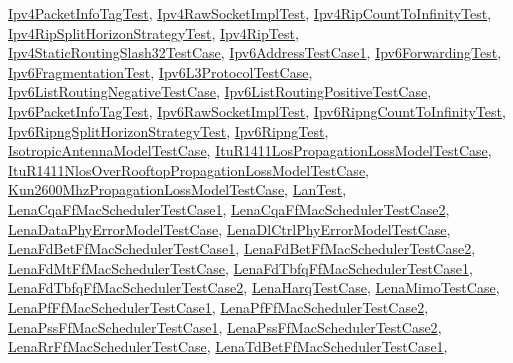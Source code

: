 \hyperlink{classIpv4PacketInfoTagTest}{Ipv4\+Packet\+Info\+Tag\+Test}, \hyperlink{classIpv4RawSocketImplTest}{Ipv4\+Raw\+Socket\+Impl\+Test}, \hyperlink{classIpv4RipCountToInfinityTest}{Ipv4\+Rip\+Count\+To\+Infinity\+Test}, \hyperlink{classIpv4RipSplitHorizonStrategyTest}{Ipv4\+Rip\+Split\+Horizon\+Strategy\+Test}, \hyperlink{classIpv4RipTest}{Ipv4\+Rip\+Test}, \hyperlink{classIpv4StaticRoutingSlash32TestCase}{Ipv4\+Static\+Routing\+Slash32\+Test\+Case}, \hyperlink{classIpv6AddressTestCase1}{Ipv6\+Address\+Test\+Case1}, \hyperlink{classIpv6ForwardingTest}{Ipv6\+Forwarding\+Test}, \hyperlink{classIpv6FragmentationTest}{Ipv6\+Fragmentation\+Test}, \hyperlink{classIpv6L3ProtocolTestCase}{Ipv6\+L3\+Protocol\+Test\+Case}, \hyperlink{classIpv6ListRoutingNegativeTestCase}{Ipv6\+List\+Routing\+Negative\+Test\+Case}, \hyperlink{classIpv6ListRoutingPositiveTestCase}{Ipv6\+List\+Routing\+Positive\+Test\+Case}, \hyperlink{classIpv6PacketInfoTagTest}{Ipv6\+Packet\+Info\+Tag\+Test}, \hyperlink{classIpv6RawSocketImplTest}{Ipv6\+Raw\+Socket\+Impl\+Test}, \hyperlink{classIpv6RipngCountToInfinityTest}{Ipv6\+Ripng\+Count\+To\+Infinity\+Test}, \hyperlink{classIpv6RipngSplitHorizonStrategyTest}{Ipv6\+Ripng\+Split\+Horizon\+Strategy\+Test}, \hyperlink{classIpv6RipngTest}{Ipv6\+Ripng\+Test}, \hyperlink{classIsotropicAntennaModelTestCase}{Isotropic\+Antenna\+Model\+Test\+Case}, \hyperlink{classItuR1411LosPropagationLossModelTestCase}{Itu\+R1411\+Los\+Propagation\+Loss\+Model\+Test\+Case}, \hyperlink{classItuR1411NlosOverRooftopPropagationLossModelTestCase}{Itu\+R1411\+Nlos\+Over\+Rooftop\+Propagation\+Loss\+Model\+Test\+Case}, \hyperlink{classKun2600MhzPropagationLossModelTestCase}{Kun2600\+Mhz\+Propagation\+Loss\+Model\+Test\+Case}, \hyperlink{classLanTest}{Lan\+Test}, \hyperlink{classLenaCqaFfMacSchedulerTestCase1}{Lena\+Cqa\+Ff\+Mac\+Scheduler\+Test\+Case1}, \hyperlink{classLenaCqaFfMacSchedulerTestCase2}{Lena\+Cqa\+Ff\+Mac\+Scheduler\+Test\+Case2}, \hyperlink{classLenaDataPhyErrorModelTestCase}{Lena\+Data\+Phy\+Error\+Model\+Test\+Case}, \hyperlink{classLenaDlCtrlPhyErrorModelTestCase}{Lena\+Dl\+Ctrl\+Phy\+Error\+Model\+Test\+Case}, \hyperlink{classLenaFdBetFfMacSchedulerTestCase1}{Lena\+Fd\+Bet\+Ff\+Mac\+Scheduler\+Test\+Case1}, \hyperlink{classLenaFdBetFfMacSchedulerTestCase2}{Lena\+Fd\+Bet\+Ff\+Mac\+Scheduler\+Test\+Case2}, \hyperlink{classLenaFdMtFfMacSchedulerTestCase}{Lena\+Fd\+Mt\+Ff\+Mac\+Scheduler\+Test\+Case}, \hyperlink{classLenaFdTbfqFfMacSchedulerTestCase1}{Lena\+Fd\+Tbfq\+Ff\+Mac\+Scheduler\+Test\+Case1}, \hyperlink{classLenaFdTbfqFfMacSchedulerTestCase2}{Lena\+Fd\+Tbfq\+Ff\+Mac\+Scheduler\+Test\+Case2}, \hyperlink{classLenaHarqTestCase}{Lena\+Harq\+Test\+Case}, \hyperlink{classLenaMimoTestCase}{Lena\+Mimo\+Test\+Case}, \hyperlink{classLenaPfFfMacSchedulerTestCase1}{Lena\+Pf\+Ff\+Mac\+Scheduler\+Test\+Case1}, \hyperlink{classLenaPfFfMacSchedulerTestCase2}{Lena\+Pf\+Ff\+Mac\+Scheduler\+Test\+Case2}, \hyperlink{classLenaPssFfMacSchedulerTestCase1}{Lena\+Pss\+Ff\+Mac\+Scheduler\+Test\+Case1}, \hyperlink{classLenaPssFfMacSchedulerTestCase2}{Lena\+Pss\+Ff\+Mac\+Scheduler\+Test\+Case2}, \hyperlink{classLenaRrFfMacSchedulerTestCase}{Lena\+Rr\+Ff\+Mac\+Scheduler\+Test\+Case}, \hyperlink{classLenaTdBetFfMacSchedulerTestCase1}{Lena\+Td\+Bet\+Ff\+Mac\+Scheduler\+Test\+Case1}, 